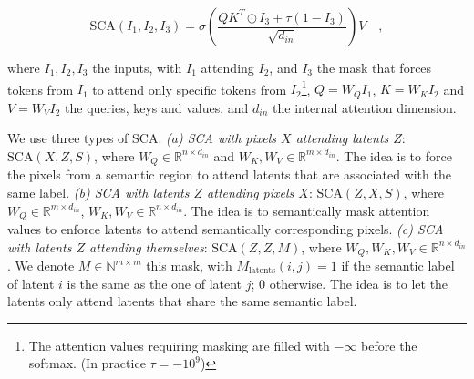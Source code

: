 \documentclass[runningheads]{llncs}
\begin{document}
\begin{footnotesize}
\begin{equation}
    \text{SCA}(I_{1}, I_{2}, I_{3}) = \sigma\left(\frac{QK^T\odot I_{3} +\tau \left(1-I_{3}\right)}{\sqrt{d_{in}}}\right)V \quad ,
\end{equation}
\end{footnotesize}
\noindent where $I_{1},I_{2},I_{3}$ the inputs, with $I_{1}$ attending $I_{2}$, and $I_{3}$ the mask that forces tokens from $I_1$ to attend only specific tokens from $I_2$\footnote{{\label{fnote1}}The attention values requiring masking are filled with $-\infty$ before the softmax. (In practice $\tau{=}-10^9$) }, $Q {=} W_QI_{1}$, $K {=} W_KI_{2}$ and $V {=} W_VI_{2}$ the queries, keys and values, and $d_{in}$ the internal attention dimension.

We use three types of SCA. 
\noindent \textit{(a) SCA with pixels $X$ attending latents $Z$}: $\text{SCA}(X, Z, S)$, where $W_{Q} {\in} \mathbb{R}^{n\times d_{in}}$ and $W_{K}, W_{V} {\in} \mathbb{R}^{m\times d_{in}}$.
The idea is to force the pixels from a semantic region to attend latents that are associated with the same label. 
\noindent \textit{(b) SCA with latents $Z$ attending pixels $X$}: $\text{SCA}(Z, X, S)$, where $W_{Q}{\in} \mathbb{R}^{m\times d_{in}}$, $W_{K}, W_{V} {\in} \mathbb{R}^{n\times d_{in}}$. 
The idea is to semantically mask attention values to enforce latents to attend semantically corresponding pixels.
\noindent \textit{(c) SCA with latents $Z$ attending themselves}: $\text{SCA}(Z, Z, M)$, where $W_{Q}, W_{K}, W_{V} {\in} \mathbb{R}^{n\times d_{in}}$. We denote $M\in\mathbb{N}^{m\times m}$ this mask, with $M_{\text{latents}}(i,j) {=} 1$ if the semantic label of latent $i$ is the same as the one of latent $j$; $0$ otherwise.
The idea is to let the latents only attend latents that share the same semantic label. 
\end{document}
